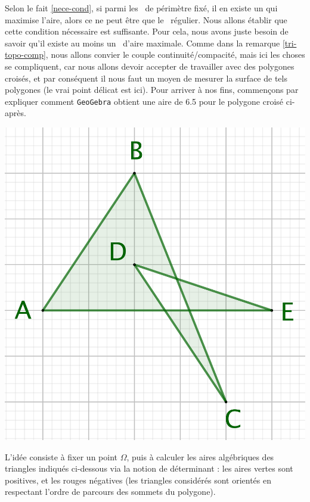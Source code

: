 Selon le fait \ref{nece-cond}, si parmi les \ngones\ de périmètre fixé, il en existe un qui maximise l'aire, alors ce ne peut être que le \ngone\ régulier. Nous allons établir que cette condition nécessaire est suffisante. Pour cela, nous avons juste besoin de savoir qu'il existe au moins un \ngone\ d'aire maximale.
Comme dans la remarque \ref{tri-topo-comp}, nous allons convier le couple continuité/compacité, mais ici les choses se compliquent, car nous allons devoir accepter de travailler avec des polygones croisés, et par conséquent il nous faut un moyen de mesurer la surface de tels polygones (le vrai point délicat est ici). 
Pour arriver à nos fins, commençons par expliquer comment \texttt{GeoGebra} obtient une aire de \num{6.5} pour le polygone croisé ci-après.


\begin{center}
	\includegraphics[scale=.4]{content/polygon/sufficient-cond/alg-surf-why.png}
\end{center}


\medskip

L'idée consiste à fixer un point $\Omega$, puis à calculer les aires algébriques des triangles indiqués ci-dessous via la notion de déterminant : les aires vertes sont positives, et les rouges négatives (les triangles considérés sont orientés en respectant l'ordre de parcours des sommets du polygone).

